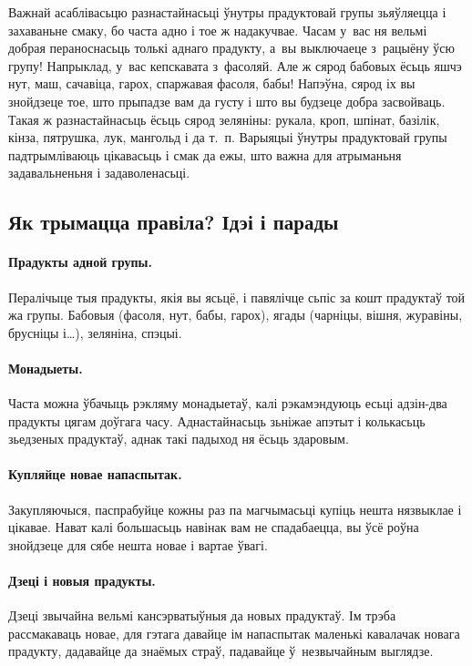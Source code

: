 Важнай асаблівасьцю разнастайнасьці ўнутры прадуктовай групы зьяўляецца і захаваньне смаку, бо часта адно і тое ж надакучвае. Часам у~вас ня вельмі добрая пераноснасьць толькі аднаго прадукту, а~вы выключаеце з~рацыёну ўсю групу! Напрыклад, у~вас кепскавата з~фасоляй. Але ж сярод бабовых ёсьць яшчэ нут, маш, сачавіца, гарох, спаржавая фасоля, бабы! Напэўна, сярод іх вы знойдзеце тое, што прыпадзе вам да густу і што вы будзеце добра засвойваць. Такая ж разнастайнасьць ёсьць сярод зеляніны: рукала, кроп, шпінат, базілік, кінза, пятрушка, лук, мангольд і да т.~п. Варыяцыі ўнутры прадуктовай групы падтрымліваюць цікавасьць і смак да ежы, што важна для атрыманьня задавальненьня і задаволенасьці.

\subsection{Як трымацца правіла? Ідэі і парады}

\paragraph{Прадукты адной групы.}
Пералічыце тыя прадукты, якія вы ясьцё, і павялічце сьпіс за кошт прадуктаў той жа групы. Бабовыя (фасоля, нут, бабы, гарох), ягады (чарніцы, вішня, журавіны, брусніцы і…), зеляніна, спэцыі.

\paragraph{Монадыеты.}
Часта можна ўбачыць рэкляму монадыетаў, калі рэкамэндуюць есьці адзін-два прадукты цягам доўгага часу. Аднастайнасьць зьніжае апэтыт і колькасьць зьедзеных прадуктаў, аднак такі падыход ня ёсьць здаровым.

\paragraph{Купляйце новае напаспытак.}
Закупляючыся, паспрабуйце кожны раз па магчымасьці купіць нешта нязвыклае і цікавае. Нават калі большасьць навінак вам не спадабаецца, вы ўсё роўна знойдзеце для сябе нешта новае і вартае ўвагі.


\paragraph{Дзеці і новыя прадукты.}
Дзеці звычайна вельмі кансэрватыўныя да новых прадуктаў. Ім трэба рассмакаваць новае, для гэтага давайце ім напаспытак маленькі кавалачак новага прадукту, дадавайце да знаёмых страў, падавайце ў~незвычайным выглядзе.

